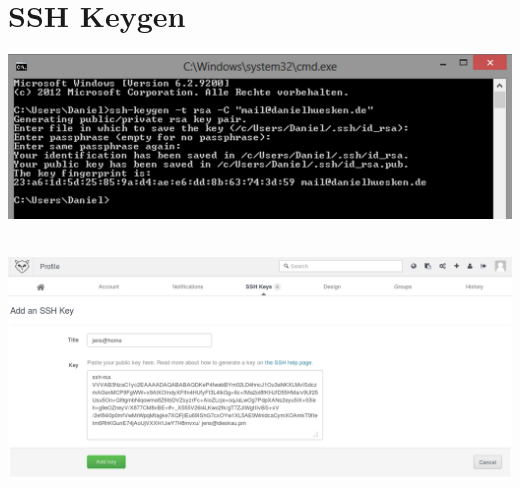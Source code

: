 \documentclass[c]{beamer}
\begin{document}
\section{SSH Keygen}
\begin{frame}
  \begin{center}
  \end{center}
\end{frame}

\begin{frame}
 \begin{center}
    \includegraphics[scale=0.22]{images/ssh.png}
 \end{center}
\end{frame}

\begin{frame}
 \begin{center}
     \\
    \vspace{20pt}
    \includegraphics[scale=0.21]{images/github-sshkey.png}

 \end{center}
\end{frame}
\end{document}
